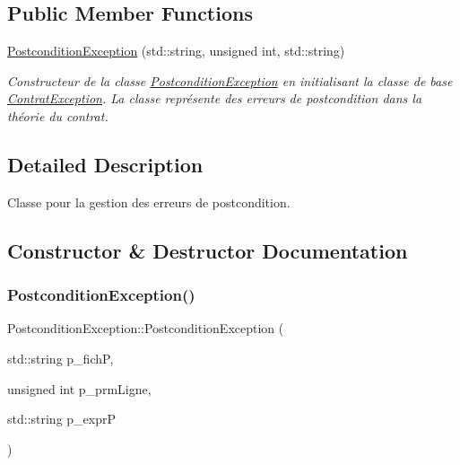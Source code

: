 \subsection*{Public Member Functions}
\begin{DoxyCompactItemize}
\item 
\hyperlink{classPostconditionException_acc95ea17c4302b996261b7201d2cf6c4}{Postcondition\+Exception} (std\+::string, unsigned int, std\+::string)
\begin{DoxyCompactList}\small\item\em Constructeur de la classe \hyperlink{classPostconditionException}{Postcondition\+Exception} en initialisant la classe de base \hyperlink{classContratException}{Contrat\+Exception}. La classe représente des erreurs de postcondition dans la théorie du contrat. \end{DoxyCompactList}\end{DoxyCompactItemize}


\subsection{Detailed Description}
Classe pour la gestion des erreurs de postcondition. 

\subsection{Constructor \& Destructor Documentation}
\mbox{\label{classPostconditionException_acc95ea17c4302b996261b7201d2cf6c4}} 
\subsubsection{\texorpdfstring{Postcondition\+Exception()}{PostconditionException()}}
{\footnotesize\ttfamily Postcondition\+Exception\+::\+Postcondition\+Exception (\begin{DoxyParamCaption}\item[{std\+::string}]{p\+\_\+fichP,  }\item[{unsigned int}]{p\+\_\+prm\+Ligne,  }\item[{std\+::string}]{p\+\_\+exprP }\end{DoxyParamCaption})}



